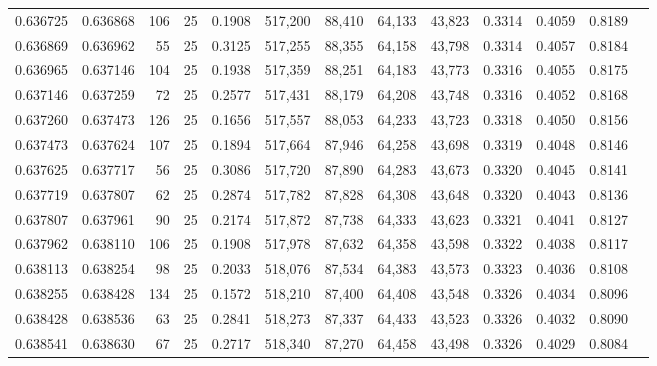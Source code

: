 \begin{tabular}{rrrrrrrrrrrrr}
0.636725 & 0.636868 &   106 &  25 &                                     0.1908 & 517,200 &  88,410 &  64,133 &  43,823 & 0.3314 & 0.4059 & 0.8189 \\
0.636869 & 0.636962 &    55 &  25 &                                     0.3125 & 517,255 &  88,355 &  64,158 &  43,798 & 0.3314 & 0.4057 & 0.8184 \\
0.636965 & 0.637146 &   104 &  25 &                                     0.1938 & 517,359 &  88,251 &  64,183 &  43,773 & 0.3316 & 0.4055 & 0.8175 \\
0.637146 & 0.637259 &    72 &  25 &                                     0.2577 & 517,431 &  88,179 &  64,208 &  43,748 & 0.3316 & 0.4052 & 0.8168 \\
0.637260 & 0.637473 &   126 &  25 &                                     0.1656 & 517,557 &  88,053 &  64,233 &  43,723 & 0.3318 & 0.4050 & 0.8156 \\
0.637473 & 0.637624 &   107 &  25 &                                     0.1894 & 517,664 &  87,946 &  64,258 &  43,698 & 0.3319 & 0.4048 & 0.8146 \\
0.637625 & 0.637717 &    56 &  25 &                                     0.3086 & 517,720 &  87,890 &  64,283 &  43,673 & 0.3320 & 0.4045 & 0.8141 \\
0.637719 & 0.637807 &    62 &  25 &                                     0.2874 & 517,782 &  87,828 &  64,308 &  43,648 & 0.3320 & 0.4043 & 0.8136 \\
0.637807 & 0.637961 &    90 &  25 &                                     0.2174 & 517,872 &  87,738 &  64,333 &  43,623 & 0.3321 & 0.4041 & 0.8127 \\
0.637962 & 0.638110 &   106 &  25 &                                     0.1908 & 517,978 &  87,632 &  64,358 &  43,598 & 0.3322 & 0.4038 & 0.8117 \\
0.638113 & 0.638254 &    98 &  25 &                                     0.2033 & 518,076 &  87,534 &  64,383 &  43,573 & 0.3323 & 0.4036 & 0.8108 \\
0.638255 & 0.638428 &   134 &  25 &                                     0.1572 & 518,210 &  87,400 &  64,408 &  43,548 & 0.3326 & 0.4034 & 0.8096 \\
0.638428 & 0.638536 &    63 &  25 &                                     0.2841 & 518,273 &  87,337 &  64,433 &  43,523 & 0.3326 & 0.4032 & 0.8090 \\
0.638541 & 0.638630 &    67 &  25 &                                     0.2717 & 518,340 &  87,270 &  64,458 &  43,498 & 0.3326 & 0.4029 & 0.8084 \\

\end{tabular}

